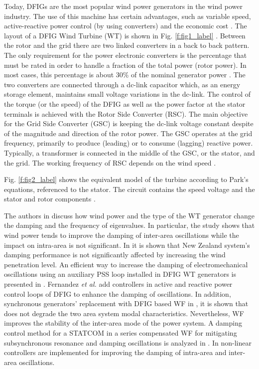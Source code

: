 \documentclass[conference,11pt]{IEEEtran}
\begin{document}
Today, DFIGs are the most popular wind power generators in the wind power industry. The use of this machine has certain advantages, such as variable speed, active-reactive power control (by using converters) and the economic cost \cite{ref1}. The layout of a DFIG Wind Turbine (WT) is shown in Fig. \ref{f:fig1_label} \cite{ref2}. Between the rotor and the grid there are two linked converters in a back to back pattern. The only requirement for the power electronic converters is the percentage that must be rated in order to handle a fraction of the total power (rotor power). In most cases, this percentage is about 30\% of the nominal generator power \cite{ref3}. The two converters are connected through a dc-link capacitor which, as an energy storage element, maintains small voltage variations in the dc-link. The control of the torque (or the speed) of the DFIG as well as the power factor at the stator terminals is achieved with the Rotor Side Converter (RSC). The main objective for the Grid Side Converter (GSC) is keeping the dc-link voltage constant despite of the magnitude and direction of the rotor power. The GSC operates at the grid frequency, primarily to produce (leading) or to consume (lagging) reactive power.  Typically, a transformer is connected in the middle of the GSC, or the stator, and the grid.  The working frequency of RSC depends on the wind speed \cite{ref2}. 

Fig. \ref{f:fig2_label} shows the equivalent model of the turbine according to Park’s equations, referenced to the stator. The circuit contains the speed voltage  and the stator and rotor components \cite{ref1}. 

The authors in \cite{ref3} discuss how wind power and the type of the WT generator change the damping and the frequency of eigenvalues. In particular, the study shows that wind power tends to improve the damping of inter-area oscillations while the impact on intra-area is not significant. In \cite{ref4} it is shown that New Zealand system’s damping performance is not significantly affected by increasing the wind penetration level. An efficient way to increase the damping of electromechanical oscillations using an auxiliary PSS loop installed in DFIG WT generators is presented in \cite{ref5}. Fernandez \textit{et al.} \cite{ref6} add controllers in active and reactive power control loops of DFIG to enhance the damping of oscillations. In addition, synchronous generators' replacement with DFIG based WF in \cite{ref7}, it is shown that does not degrade the two area system modal characteristics. Nevertheless, WF improves the stability of the inter-area mode of the power system. A damping control method for a STATCOM in a series compensated WF for mitigating subsynchronous resonance and damping oscillations is analyzed in \cite{ref8}. In \cite{ref9} non-linear controllers are implemented for improving the damping of intra-area and inter-area oscillations. 
\end{document}
